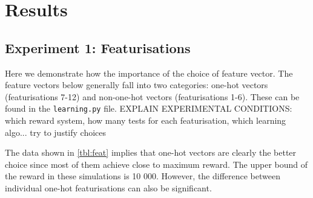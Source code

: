 \documentclass[11point]{article}
\begin{document}
%
%



\section{Results}

\subsection{Experiment 1: Featurisations}

Here we demonstrate how the importance of the choice of feature vector.
The feature vectors below generally fall into two categories: one-hot vectors (featurisations 7-12) and non-one-hot vectors (featurisations 1-6).
These can be found in the \texttt{learning.py} file.
EXPLAIN EXPERIMENTAL CONDITIONS: which reward system, how many tests for each featurisation, which learning algo... try to justify choices

The data shown in \autoref{tbl:feat} implies that one-hot vectors are clearly the better choice since most of them achieve close to maximum reward. The upper bound of the reward in these simulations is 10 000. However, the difference between individual one-hot featurisations can also be significant.
\end{document}
